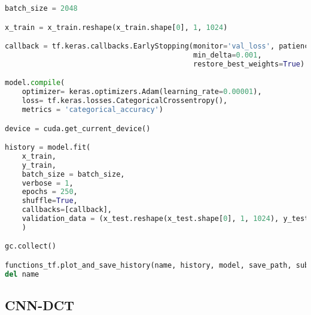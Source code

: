 \begin{lstlisting}[language=Python]
batch_size = 2048

x_train = x_train.reshape(x_train.shape[0], 1, 1024)

callback = tf.keras.callbacks.EarlyStopping(monitor='val_loss', patience=10,
                                            min_delta=0.001,
                                            restore_best_weights=True)

model.compile(
    optimizer= keras.optimizers.Adam(learning_rate=0.00001),
    loss= tf.keras.losses.CategoricalCrossentropy(),
    metrics = 'categorical_accuracy')

device = cuda.get_current_device()

history = model.fit(
    x_train,
    y_train,
    batch_size = batch_size,
    verbose = 1,
    epochs = 250,
    shuffle=True,
    callbacks=[callback],
    validation_data = (x_test.reshape(x_test.shape[0], 1, 1024), y_test)
    )

gc.collect()

functions_tf.plot_and_save_history(name, history, model, save_path, subfolder='CNN')
del name
\end{lstlisting}

\hypertarget{cnn-dct}{%
\subsection{CNN-DCT}\label{cnn-dct}}

